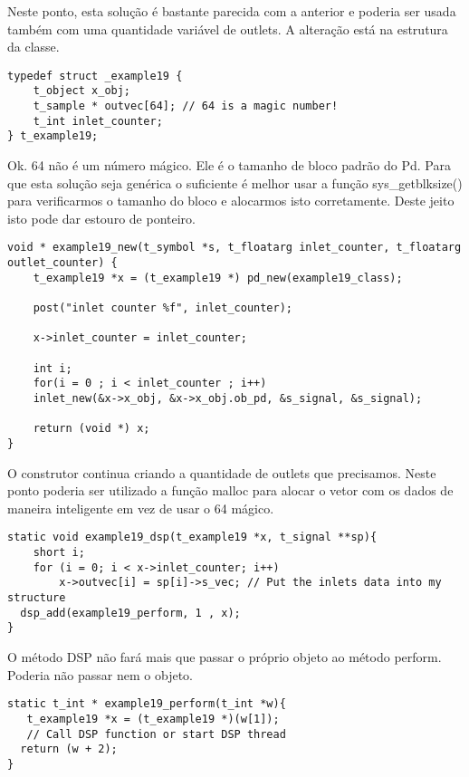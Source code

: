 Neste ponto, esta solução é bastante parecida com a anterior e poderia ser usada também com uma quantidade
variável de outlets. A alteração está na estrutura da classe.

\begin{lstlisting}
typedef struct _example19 {
    t_object x_obj;
    t_sample * outvec[64]; // 64 is a magic number!
    t_int inlet_counter;
} t_example19;
\end{lstlisting}

Ok. 64 não é um número mágico. Ele é o tamanho de bloco padrão do Pd. Para que esta solução
seja genérica o suficiente é melhor usar a função sys\_getblksize() para verificarmos o tamanho
do bloco e alocarmos isto corretamente. Deste jeito isto pode dar estouro de ponteiro. 

\begin{lstlisting}
void * example19_new(t_symbol *s, t_floatarg inlet_counter, t_floatarg outlet_counter) {
    t_example19 *x = (t_example19 *) pd_new(example19_class);

    post("inlet counter %f", inlet_counter);

    x->inlet_counter = inlet_counter;

    int i;
    for(i = 0 ; i < inlet_counter ; i++)
	inlet_new(&x->x_obj, &x->x_obj.ob_pd, &s_signal, &s_signal);

    return (void *) x;
}
\end{lstlisting}

O construtor continua criando a quantidade de outlets que precisamos. Neste ponto poderia
ser utilizado a função malloc para alocar o vetor com os dados de maneira inteligente em 
vez de usar o 64 mágico.

\begin{lstlisting}
static void example19_dsp(t_example19 *x, t_signal **sp){
    short i;
    for (i = 0; i < x->inlet_counter; i++)
        x->outvec[i] = sp[i]->s_vec; // Put the inlets data into my structure
  dsp_add(example19_perform, 1 , x);
}
\end{lstlisting}

O método DSP não fará mais que passar o próprio objeto ao método perform. Poderia não passar nem o objeto.

\begin{lstlisting}
static t_int * example19_perform(t_int *w){
   t_example19 *x = (t_example19 *)(w[1]);
   // Call DSP function or start DSP thread
  return (w + 2);
}
\end{lstlisting}

